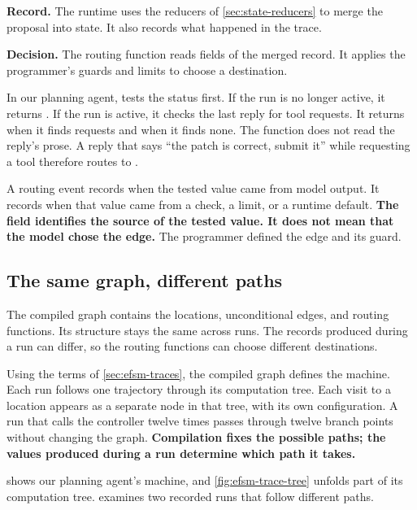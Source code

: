\item \textbf{Record.} The runtime uses the reducers of \cref{sec:state-reducers} to merge the
proposal into state. It also records what happened in the trace.

\item \textbf{Decision.} The routing function reads fields of the merged record. It applies the
programmer's guards and limits to choose a destination.

\ei

In our planning agent,  tests the status first. If the run is no longer
active, it returns . If the run is active, it checks the last reply for tool requests.
It returns  when it finds requests and  when it finds none.
The function does not read the reply's prose.
A reply that says ``the
patch is correct, submit it'' while requesting a tool therefore routes to .

A routing event records  when the tested value came from model output. It
records  when that value came from a check, a limit, or a runtime default.
\textbf{The field identifies the source of the tested value. It does not mean that the model chose
the edge.} The programmer defined the edge and its guard.

\subsection{The same graph, different paths}
\label{sec:control-paths}

The compiled graph contains the locations, unconditional edges, and routing functions. Its
structure stays the same across runs. The records produced during a run can differ, so the routing
functions can choose different destinations.

Using the terms of \cref{sec:efsm-traces}, the compiled graph defines the machine. Each run follows
one trajectory through its computation tree. Each visit to a location appears as a separate node
in that tree, with its own configuration. A run that calls the controller twelve times passes
through twelve branch points without changing the graph. \textbf{Compilation fixes the possible
paths; the values produced during a run determine which path it takes.}

 shows our planning agent's machine, and \cref{fig:efsm-trace-tree} unfolds part of
its computation tree.  examines two recorded runs that follow different paths.

